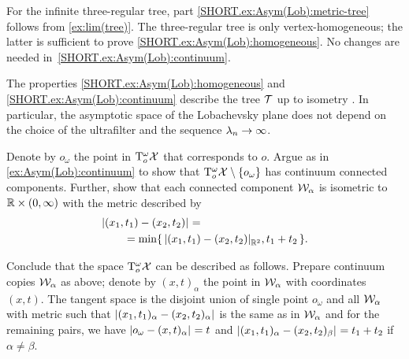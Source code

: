 For the infinite three-regular tree, part \ref{SHORT.ex:Asym(Lob):metric-tree} follows from \ref{ex:lim(tree)}.
The three-regular tree is only vertex-homogeneous; the latter is sufficient to prove \ref{SHORT.ex:Asym(Lob):homogeneous}.
No changes are needed in~\ref{SHORT.ex:Asym(Lob):continuum}.

The properties \ref{SHORT.ex:Asym(Lob):homogeneous} and \ref{SHORT.ex:Asym(Lob):continuum} describe the tree $\mathcal{T}$ up to isometry \cite{dyubina-polterovich}.
In particular, the asymptotic space of the Lobachevsky plane does not depend on the choice of the ultrafilter and the sequence $\lambda_n\z\to \infty$.


Denote by $o_\omega$ the point in $\mathrm{T}^\omega_o\mathcal{X}$ that corresponds to $o$.
Argue as in \ref{ex:Asym(Lob):continuum} to show that $\mathrm{T}^\omega_o\mathcal{X}\setminus \{o_\omega\}$ has continuum connected components.
Further, show that each connected component $\mathcal{W}_\alpha$ is isometric to $\mathbb{R}\times (0,\infty)$ with the metric described by
\begin{align*}
&\dist{(x_1,t_1)}{(x_2,t_2)}{}=
\\
&\qquad=\min\{\,\dist{(x_1,t_1)}{(x_2,t_2)}{\RR^2},t_1+t_2\,\}.
\end{align*}

Conclude that the space $\mathrm{T}^\omega_o\mathcal{X}$ can be described as follows.
Prepare continuum copies $\mathcal{W}_\alpha$ as above;
denote by $(x,t)_\alpha$ the point in $\mathcal{W}_\alpha$ with coordinates $(x,t)$.
The tangent space is the disjoint union of single point $o_\omega$ and all $\mathcal{W}_\alpha$ with metric
such that $\dist{(x_1,t_1)_\alpha}{(x_2,t_2)_\alpha}{}$ is the same as in $\mathcal{W}_\alpha$ and for the remaining pairs, we have $\dist{o_\omega}{(x,t)_\alpha}{}=t$ and $\dist{(x_1,t_1)_\alpha}{(x_2,t_2)_\beta}{}=t_1+t_2$
if $\alpha\ne\beta$.
